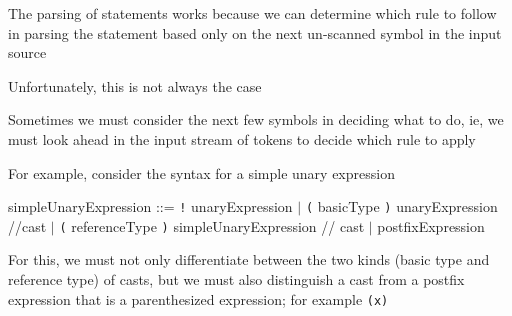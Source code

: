 \documentclass[8pt,a4paper,compress]{beamer}
\newcommand{\mm}[1]{$#1$}
\newenvironment{spaced}
{
\smallskip
\hspace{.5cm}
\begin{minipage}[c]{\textwidth}
}
{
\end{minipage}
\smallskip
}
\begin{document}
\begin{frame}[fragile]
\pause

The parsing of statements works because we can determine which rule to follow in parsing the statement based only on the next un-scanned symbol in the input source

\pause
\bigskip

Unfortunately, this is not always the case

\pause
\bigskip

Sometimes we must consider the next few symbols in deciding what to do, ie, we must look ahead in the input stream of tokens to decide which rule to apply

\pause
\bigskip

For example, consider the syntax for a simple unary expression

\text{ }
\begin{spaced}
\begin{production}
simpleUnaryExpression ::= \lstinline{!} unaryExpression
                                   \mm{|} \lstinline{(} basicType \lstinline{)}  unaryExpression //cast
                                   \mm{|} \lstinline{(} referenceType \lstinline{)} simpleUnaryExpression // cast
                                   \mm{|} postfixExpression
\end{production}
\end{spaced}

\pause
\bigskip

For this, we must not only differentiate between the two kinds (basic type and reference type) of casts, but we must also distinguish a cast from a postfix expression that is a parenthesized expression; for example \lstinline{(x)}
\end{frame}
\end{document}
